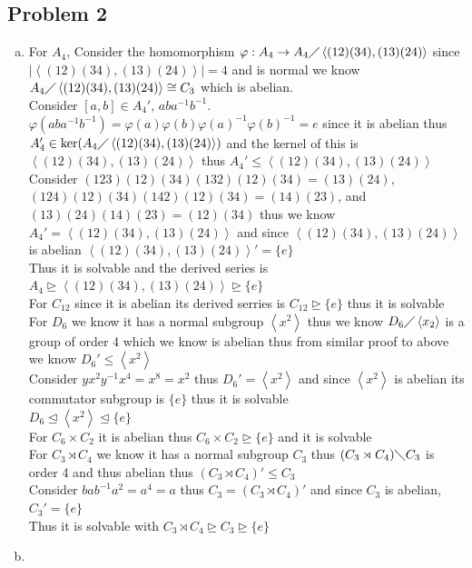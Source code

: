 \documentclass[12pt, letterpaper]{article}
\theoremstyle{definition}
\renewcommand{\t}[1]{\text{#1}}
\newcommand{\ang}[1]{\left\langle #1 \right\rangle}
\begin{document}
\newpage
\subsection*{Problem 2}
\begin{enumerate}[(a)]
    \item For $A_4$, Consider the homomorphism $\varphi : A_4 \rightarrow A_4 \diagup \ang{(12)(34),(13)(24)}$ since $|\ang{(12)(34),(13)(24)}|=4$ and is normal we know $A_4 \diagup \ang{(12)(34),(13)(24)} \cong C_3$ which is abelian.\\
    Consider $[a,b] \in A_4'$, $aba^{-1}b^{-1}$. $\varphi(aba^{-1}b^{-1})=\varphi(a)\varphi(b)\varphi(a)^{-1}\varphi(b)^{-1}=e$ since it is abelian thus $A_4' \in \t{ker}(A_4 \diagup \ang{(12)(34),(13)(24)})$ and the kernel of this is $\ang{(12)(34),(13)(24)}$ thus $A_4' \leq \ang{(12)(34),(13)(24)}$\\
    Consider $(123)(12)(34)(132)(12)(34)=(13)(24)$, $(124)(12)(34)(142)(12)(34)=(14)(23)$, and $(13)(24)(14)(23)=(12)(34)$ thus we know $A_4' = \ang{(12)(34),(13)(24)}$ and since $\ang{(12)(34),(13)(24)}$ is abelian $\ang{(12)(34),(13)(24)}'=\{e\}$\\
    Thus it is solvable and the derived series is $A_4 \unrhd \ang{(12)(34),(13)(24)} \unrhd \{e\}$\\
    For $C_{12}$ since it is abelian its derived serries is $C_{12} \unrhd \{e\}$ thus it is solvable\\
    For $D_6$ we know it has a normal subgroup $\ang{x^2}$ thus we know $D_6 \diagup \ang{x_2}$ is a group of order 4 which we know is abelian thus from similar proof to above we know $D_6' \leq \ang{x^2}$\\
    Consider $yx^2y^{-1}x^{4}=x^{8}=x^{2}$ thus $D_6' = \ang{x^2}$ and since $\ang{x^2}$ is abelian its commutator subgroup is $\{e\}$ thus it is solvable\\
    $D_6 \unlhd \ang{x^2} \unlhd \{e\}$\\
    For $C_6 \times C_2$ it is abelian thus $C_6 \times C_2 \unrhd \{e\}$ and it is solvable\\
    For $C_3 \rtimes C_4$ we know it has a normal subgroup $C_3$ thus $(C_3 \rtimes C_4) \diagdown C_3$ is order 4 and thus abelian thus $(C_3 \rtimes C_4)' \leq C_3$\\
    Consider $bab^{-1}a^2=a^4=a$ thus $C_3 = (C_3 \rtimes C_4)'$ and since $C_3$ is abelian, $C_3'=\{e\}$\\
    Thus it is solvable with $C_3 \rtimes C_4 \unrhd C_3 \unrhd \{e\}$
    \item \begin{itemize}

\end{itemize}
\end{enumerate}
\end{document}
